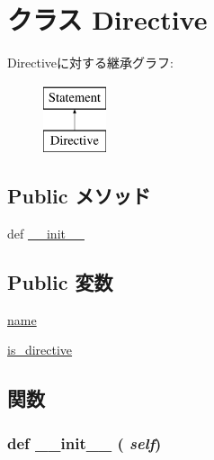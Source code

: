 \hypertarget{classmicro__asm_1_1Directive}{
\section{クラス Directive}
\label{classmicro__asm_1_1Directive}
}
Directiveに対する継承グラフ:\begin{figure}[H]
\begin{center}
\leavevmode
\includegraphics[height=2cm]{classmicro__asm_1_1Directive}
\end{center}
\end{figure}
\subsection*{Public メソッド}
\begin{DoxyCompactItemize}
\item 
def \hyperlink{classmicro__asm_1_1Directive_ac775ee34451fdfa742b318538164070e}{\_\-\_\-init\_\-\_\-}
\end{DoxyCompactItemize}
\subsection*{Public 変数}
\begin{DoxyCompactItemize}
\item 
\hyperlink{classmicro__asm_1_1Directive_ab74e6bf80237ddc4109968cedc58c151}{name}
\item 
\hyperlink{classmicro__asm_1_1Directive_a7715b944fddfe15aad875fe3c226d81b}{is\_\-directive}
\end{DoxyCompactItemize}


\subsection{関数}
\hypertarget{classmicro__asm_1_1Directive_ac775ee34451fdfa742b318538164070e}{
\subsubsection[{\_\-\_\-init\_\-\_\-}]{\setlength{\rightskip}{0pt plus 5cm}def \_\-\_\-init\_\-\_\- ( {\em self})}}
\label{classmicro__asm_1_1Directive_ac775ee34451fdfa742b318538164070e}



